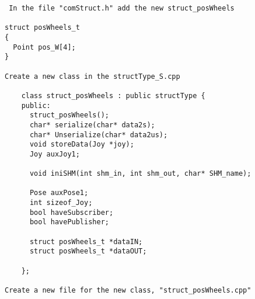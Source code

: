 \begin{verbatim}
 In the file "comStruct.h" add the new struct_posWheels

struct posWheels_t
{
  Point pos_W[4];
}

Create a new class in the structType_S.cpp

    class struct_posWheels : public structType {
    public:
      struct_posWheels();
      char* serialize(char* data2s);
      char* Unserialize(char* data2us);
      void storeData(Joy *joy);
      Joy auxJoy1;

      void iniSHM(int shm_in, int shm_out, char* SHM_name);

      Pose auxPose1;
      int sizeof_Joy;
      bool haveSubscriber;
      bool havePublisher;

      struct posWheels_t *dataIN;
      struct posWheels_t *dataOUT;

    };

Create a new file for the new class, "struct_posWheels.cpp"


\end{verbatim}


